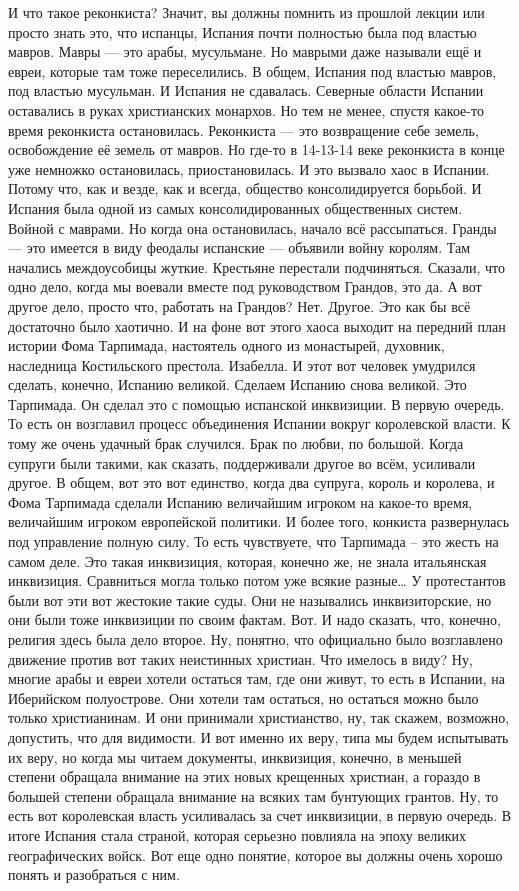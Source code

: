 И что такое реконкиста? Значит, вы
должны помнить из прошлой лекции или просто знать это, что испанцы, Испания
почти полностью была под властью мавров. Мавры — это арабы, мусульмане. Но
маврыми даже называли ещё и евреи, которые там тоже переселились. В общем,
Испания под властью мавров, под властью мусульман. И Испания не сдавалась.
Северные области Испании оставались в руках христианских монархов. Но тем не
менее, спустя какое-то время реконкиста остановилась. Реконкиста — это
возвращение себе земель, освобождение её земель от мавров. Но где-то в 14-13-14
веке реконкиста в конце уже немножко остановилась, приостановилась. И это
вызвало хаос в Испании. Потому что, как и везде, как и всегда, общество
консолидируется борьбой. И Испания была одной из самых консолидированных
общественных систем. Войной с маврами. Но когда она остановилась, начало всё
рассыпаться. Гранды — это имеется в виду феодалы испанские — объявили войну
королям. Там начались междоусобицы жуткие. Крестьяне перестали подчиняться.
Сказали, что одно дело, когда мы воевали вместе под руководством Грандов, это
да. А вот другое дело, просто что, работать на Грандов? Нет. Другое. Это как бы
всё достаточно было хаотично. И на фоне вот этого хаоса выходит на передний план
истории Фома Тарпимада, настоятель одного из монастырей, духовник, наследница
Костильского престола. Изабелла. И этот вот человек умудрился сделать, конечно,
Испанию великой. Сделаем Испанию снова великой. Это Тарпимада. Он сделал это с
помощью испанской инквизиции. В первую очередь. То есть он возглавил процесс
объединения Испании вокруг королевской власти. К тому же очень удачный брак
случился. Брак по любви, по большой. Когда супруги были такими, как сказать,
поддерживали другое во всём, усиливали другое. В общем, вот это вот единство,
когда два супруга, король и королева, и Фома Тарпимада сделали Испанию
величайшим игроком на какое-то время, величайшим игроком европейской политики. И
более того, конкиста развернулась под управление полную силу. То есть
чувствуете, что Тарпимада – это жесть на самом деле. Это такая инквизиция,
которая, конечно же, не знала итальянская инквизиция. Сравниться могла только
потом уже всякие разные… У протестантов были вот эти вот жестокие такие суды.
Они не назывались инквизиторские, но они были тоже инквизиции по своим фактам.
Вот. И надо сказать, что, конечно, религия здесь была дело второе. Ну, понятно,
что официально было возглавлено движение против вот таких неистинных христиан.
Что имелось в виду? Ну, многие арабы и евреи хотели остаться там, где они живут,
то есть в Испании, на Иберийском полуострове. Они хотели там остаться, но
остаться можно было только христианинам. И они принимали христианство, ну, так
скажем, возможно, допустить, что для видимости. И вот именно их веру, типа мы
будем испытывать их веру, но когда мы читаем документы, инквизиция, конечно, в
меньшей степени обращала внимание на этих новых крещенных христиан, а гораздо в
большей степени обращала внимание на всяких там бунтующих грантов. Ну, то есть
вот королевская власть усиливалась за счет инквизиции, в первую очередь. В итоге
Испания стала страной, которая серьезно повлияла на эпоху великих географических
войск. Вот еще одно понятие, которое вы должны очень хорошо понять и разобраться
с ним. 


